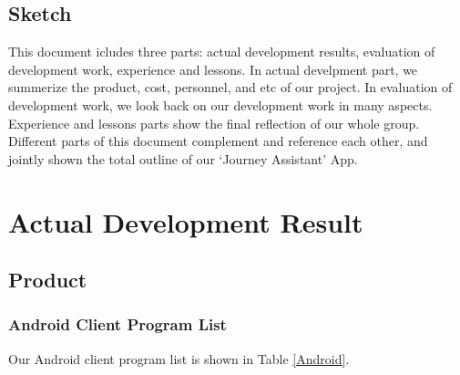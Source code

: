 \documentclass[10pt]{article}
\begin{document}
\subsection{Sketch}
This document icludes three parts: actual development results, evaluation of development work, experience and lessons. In actual develpment part, we summerize the product, cost, personnel, and etc of our project. In evaluation of development work, we look back on our development work in many aspects. Experience and lessons parts show the final reflection of our whole group. Different parts of this document complement and reference each other, and jointly shown the total outline of our ‘Journey Assistant’ App.

\section{Actual Development Result}
\subsection{Product}
\subsubsection{Android Client Program List}
Our Android client program list is shown in Table \ref{Android}.
\end{document}
